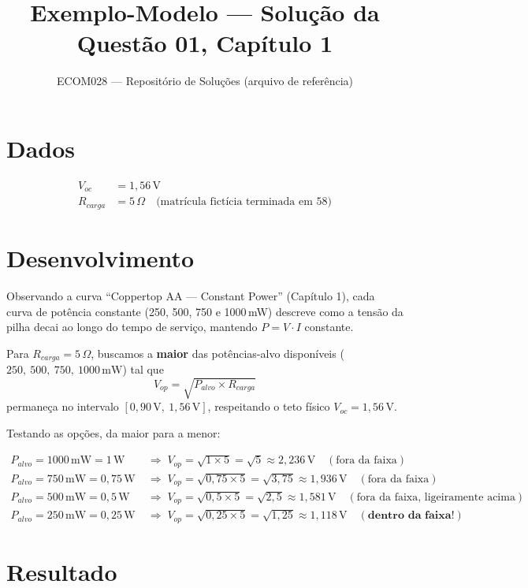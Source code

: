 \documentclass[12pt]{article}
\title{Exemplo-Modelo --- Solução da Questão 01, Capítulo 1}
\author{ECOM028 --- Repositório de Soluções (arquivo de referência)}
\date{}
\begin{document}
\maketitle

\section*{Dados}
\begin{align*}
V_{oc} &= 1{,}56\,\text{V} \\
R_{carga} &= 5\,\Omega \quad \text{(matrícula fictícia terminada em 58)}
\end{align*}

\section*{Desenvolvimento}

Observando a curva ``Coppertop AA --- Constant Power'' (Capítulo 1), cada
curva de potência constante (250, 500, 750 e 1000\,mW) descreve como a
tensão da pilha decai ao longo do tempo de serviço, mantendo $P = V \cdot I$
constante.

Para $R_{carga} = 5\,\Omega$, buscamos a \textbf{maior} das potências-alvo
disponíveis ($250,\ 500,\ 750,\ 1000\,\text{mW}$) tal que
\[
V_{op} = \sqrt{P_{alvo} \times R_{carga}}
\]
permaneça no intervalo $[0{,}90\,\text{V},\ 1{,}56\,\text{V}]$, respeitando
o teto físico $V_{oc} = 1{,}56\,\text{V}$.

Testando as opções, da maior para a menor:

\begin{align*}
P_{alvo} = 1000\,\text{mW} = 1\,\text{W} &\;\Rightarrow\; V_{op} = \sqrt{1 \times 5} = \sqrt{5} \approx 2{,}236\,\text{V} \quad (\text{fora da faixa}) \\
P_{alvo} = 750\,\text{mW} = 0{,}75\,\text{W} &\;\Rightarrow\; V_{op} = \sqrt{0{,}75 \times 5} = \sqrt{3{,}75} \approx 1{,}936\,\text{V} \quad (\text{fora da faixa}) \\
P_{alvo} = 500\,\text{mW} = 0{,}5\,\text{W} &\;\Rightarrow\; V_{op} = \sqrt{0{,}5 \times 5} = \sqrt{2{,}5} \approx 1{,}581\,\text{V} \quad (\text{fora da faixa, ligeiramente acima}) \\
P_{alvo} = 250\,\text{mW} = 0{,}25\,\text{W} &\;\Rightarrow\; V_{op} = \sqrt{0{,}25 \times 5} = \sqrt{1{,}25} \approx 1{,}118\,\text{V} \quad (\textbf{dentro da faixa!})
\end{align*}

\section*{Resultado}
\end{document}
